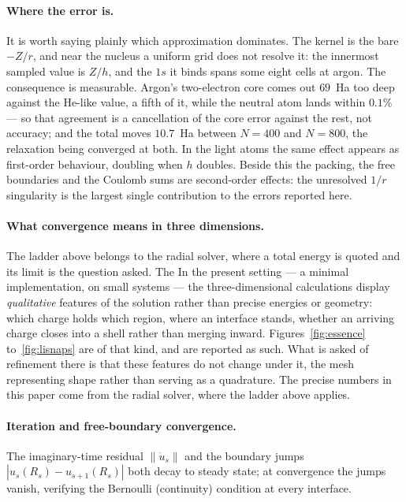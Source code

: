 \documentclass[11pt]{article}
\begin{document}
\paragraph{Where the error is.} It is worth saying plainly which approximation dominates. The
kernel is the bare $-Z/r$, and near the nucleus a uniform grid does not resolve it: the
innermost sampled value is $Z/h$, and the $1s$ it binds spans some eight cells at argon. The
consequence is measurable. Argon's two-electron core comes out $69$~Ha too deep against the
He-like value, a fifth of it, while the neutral atom lands within $0.1\%$ --- so that agreement
is a cancellation of the core error against the rest, not accuracy; and the total moves
$10.7$~Ha between $N=400$ and $N=800$, the relaxation being converged at both. In the light
atoms the same effect appears as first-order behaviour, doubling when $h$ doubles. Beside this
the packing, the free boundaries and the Coulomb sums are second-order effects: the unresolved
$1/r$ singularity is the largest single contribution to the errors reported here.

\paragraph{What convergence means in three dimensions.} The ladder above belongs to the radial
solver, where a total energy is quoted and its limit is the question asked. The
In the present setting --- a minimal implementation, on small systems --- the
three-dimensional calculations display \emph{qualitative} features of the solution rather than
precise energies or geometry: which charge holds which region, where an interface stands,
whether an arriving charge closes into a shell rather than merging inward.
Figures~\ref{fig:essence} to~\ref{fig:lisnaps} are of that kind, and are reported as such. What
is asked of refinement there is that these features do not change under it, the mesh
representing shape rather than serving as a quadrature. The precise numbers in this paper come
from the radial solver, where the ladder above applies.

\paragraph{Iteration and free-boundary convergence.} The imaginary-time residual
$\|\dot u_s\|$ and the boundary jumps $|u_s(R_s)-u_{s+1}(R_s)|$ both decay to steady
state; at convergence the jumps vanish, verifying the Bernoulli (continuity) condition at
every interface.
\end{document}
